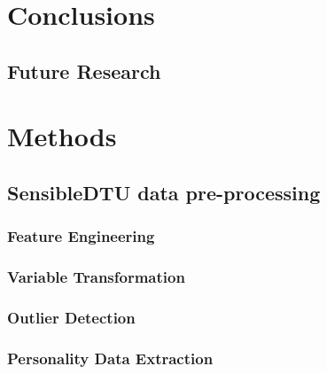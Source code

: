 \documentclass[a4paper]{article}
\begin{document}
\newpage
\section{Conclusions \label{sec:conclusions}}


	\subsection{Future Research \label{subsec:futureResearch}}
	

\newpage
\setcounter{figure}{0}
\thispagestyle{plain}


\section{Methods\label{sec:methods}}


	\subsection{SensibleDTU data pre-processing \label{subsec:behavioralDataPreprocessing}}
	

		\subsubsection{Feature Engineering \label{subsubsec:featureEngineering}}
		

		\subsubsection{Variable Transformation \label{subsubsec:variableTransformation}}
		

		\subsubsection{Outlier Detection \label{subsubsec:outlierDetection}}
		

		\subsubsection{Personality Data Extraction \label{subsubsec:extractingPersonalityData}}
		
\end{document}
